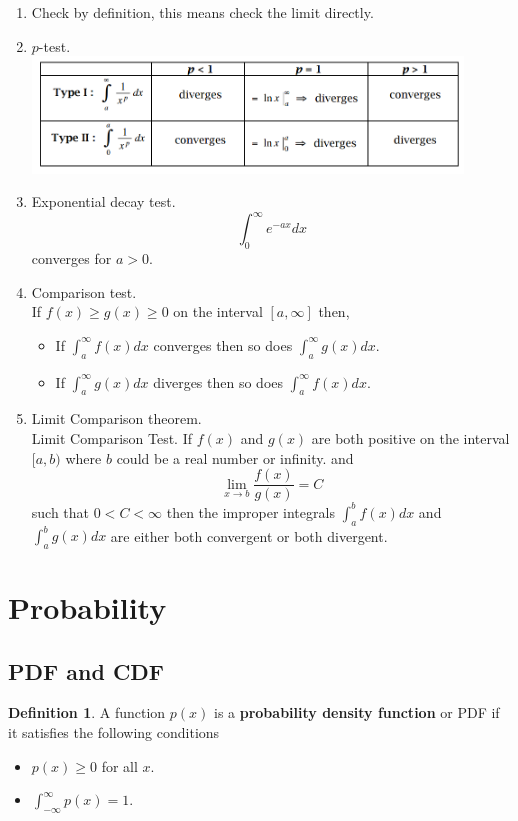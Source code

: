 \documentclass[12pt]{article}
\theoremstyle{definition}
\theoremstyle{definition}
\newtheorem{definition}{Definition}[section]
\theoremstyle{remark}
\theoremstyle{definition}
\theoremstyle{definition}
\theoremstyle{definition}
\begin{document}
\begin{enumerate}
	\item Check by definition, this means check the limit directly.
	\item $p$-test.\\
	\includegraphics*[width=0.9\textwidth]{1.png}
	\item Exponential decay test. 
	\[\int^\infty_0 e^{-ax} dx\] converges for $a>0$.
	\item Comparison test.\\
	If $f(x)\geq g(x) \geq 0$ on the interval $[a,\infty]$ then,\begin{itemize}
	\item If $\int^\infty_a f(x) dx$ converges then so does $\int^\infty_a g(x) dx$.
	\item If $\int^\infty_a g(x) dx$ diverges then so does $\int^\infty_a f(x) dx$.
	\end{itemize}
	\item Limit Comparison theorem.\\
	Limit Comparison Test. If $f(x)$ and $g(x)$ are both positive  on the interval $[a,b)$ where $b$ could be a real number or infinity.
	and
	\[\lim_{x\to b}\frac{f(x)}{g(x)} = C\] such that $0 < C < \infty$
	then the improper integrals $\int^b_a f(x) dx$ and $\int^b_a g(x) dx$ are either both convergent or both divergent.

\end{enumerate}

\section{Probability}
\subsection{PDF and CDF}
\begin{definition}
A function $p(x)$ is a \textbf{probability density function} or PDF if it satisfies the following conditions
\begin{itemize}
\item $p(x) \geq 0$ for all $x$.
\item $\int_{-\infty}^\infty p(x) = 1.$
\end{itemize}
\end{definition}
\end{document}
